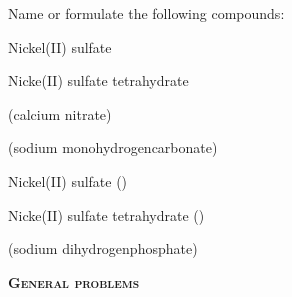 \documentclass[main.tex]{subfiles}
\begin{document}
\begin{multicols*}{2}
\begin{question}[ID=\the\value{numA}]
Name or formulate the following compounds:
\begin{inparaenum}[(a)]	
\item  {}				%
\item  {}			%
\item  Nickel(II) sulfate			%
\item  Nicke(II) sulfate tetrahydrate	%
\item {}				%
\end{inparaenum}
\end{question}
\begin{solution}
\begin{inparaenum}[(a)]
\item  {}				 (calcium nitrate)
\item  {}			 (sodium monohydrogencarbonate)
\item  Nickel(II) sulfate			 ()
\item  Nicke(II) sulfate tetrahydrate	 ()
\item {}				 (sodium dihydrogenphosphate)
 \end{inparaenum}\hspace{0.1cm}\end{solution}


{\raggedright\textsc{\textbf{General problems}}\par}



\end{multicols*}
\end{document}
